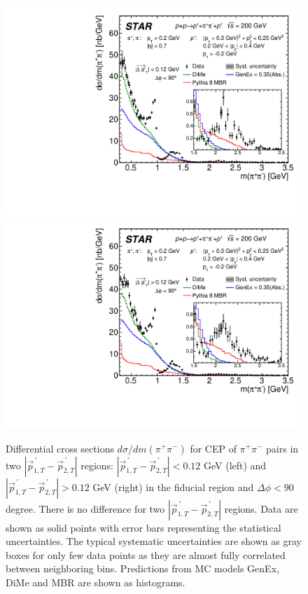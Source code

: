 \begin{figure}[t]
\centering
\hspace*{5pt}
\includegraphics[width=.46\textwidth,page=1]{graphics/physicsResults/FinalResult_InvMass_pion_SmallDpt_DeltaPhiLessThan90.pdf}
\hfill
\includegraphics[width=.46\textwidth,page=1]{graphics/physicsResults/FinalResult_InvMass_pion_LargeDpt_DeltaPhiLessThan90.pdf}
\hspace*{5pt}
%
\caption{Differential cross sections $d\sigma/dm(\pi^+\pi^-)$ for CEP of $\pi^+\pi^-$ pairs in two $|\vec{p}_{1,T}^{\,\prime}-\vec{p}_{2,T}^{\,\prime}|$ regions: $|\vec{p}_{1,T}^{\,\prime}-\vec{p}_{2,T}^{\,\prime}|<0.12$ GeV (left) and $|\vec{p}_{1,T}^{\,\prime}-\vec{p}_{2,T}^{\,\prime}|>0.12$ GeV (right)  in the fiducial region and $\Delta\phi<90$ degree. There is no difference for two $|\vec{p}_{1,T}^{\,\prime}-\vec{p}_{2,T}^{\,\prime}|$ regions. Data are shown as solid points with error bars representing the statistical uncertainties. The typical systematic uncertainties are shown as gray boxes for only few data points as they are almost fully correlated between neighboring bins. Predictions from MC models GenEx, DiMe and MBR are shown as histograms.}
\label{results_5}
\end{figure}


